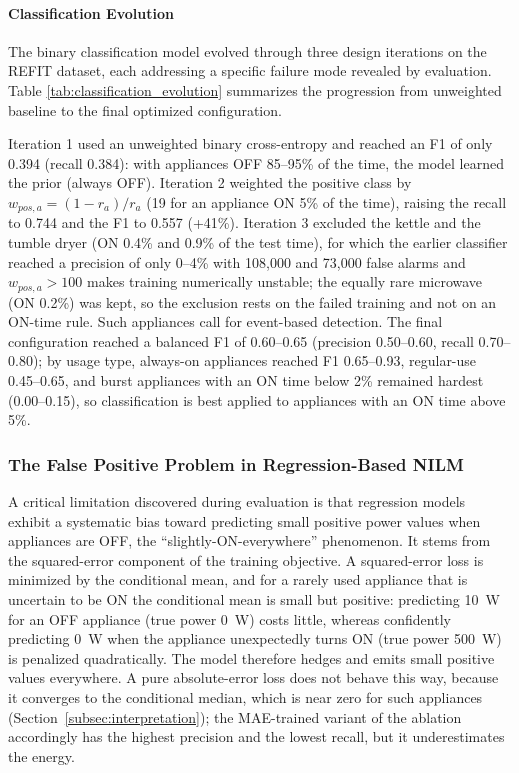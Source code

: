 \documentclass[fleqn,10pt]{wlscirep}
\begin{document}
\paragraph{Classification Evolution} The binary classification model evolved through three design iterations on the REFIT dataset, each addressing a specific failure mode revealed by evaluation. Table \ref{tab:classification_evolution} summarizes the progression from unweighted baseline to the final optimized configuration.


Iteration 1 used an unweighted binary cross-entropy and reached an F1 of only 0.394 (recall 0.384): with appliances OFF 85--95\% of the time, the model learned the prior (always OFF). Iteration 2 weighted the positive class by $w_{pos,a}=(1-r_a)/r_a$ (19 for an appliance ON 5\% of the time), raising the recall to 0.744 and the F1 to 0.557 (+41\%). Iteration 3 excluded the kettle and the tumble dryer (ON 0.4\% and 0.9\% of the test time), for which the earlier classifier reached a precision of only 0--4\% with 108{,}000 and 73{,}000 false alarms and $w_{pos,a}>100$ makes training numerically unstable; the equally rare microwave (ON 0.2\%) was kept, so the exclusion rests on the failed training and not on an ON-time rule. Such appliances call for event-based detection. The final configuration reached a balanced F1 of 0.60--0.65 (precision 0.50--0.60, recall 0.70--0.80); by usage type, always-on appliances reached F1 0.65--0.93, regular-use 0.45--0.65, and burst appliances with an ON time below 2\% remained hardest (0.00--0.15), so classification is best applied to appliances with an ON time above 5\%.

\subsubsection{The False Positive Problem in Regression-Based NILM}
\label{subsubsec:false_positive_problem}

A critical limitation discovered during evaluation is that regression models exhibit a systematic bias toward predicting small positive power values when appliances are OFF, the ``slightly-ON-everywhere'' phenomenon. It stems from the squared-error component of the training objective. A squared-error loss is minimized by the conditional mean, and for a rarely used appliance that is uncertain to be ON the conditional mean is small but positive: predicting 10~W for an OFF appliance (true power 0~W) costs little, whereas confidently predicting 0~W when the appliance unexpectedly turns ON (true power 500~W) is penalized quadratically. The model therefore hedges and emits small positive values everywhere. A pure absolute-error loss does not behave this way, because it converges to the conditional median, which is near zero for such appliances (Section~\ref{subsec:interpretation}); the MAE-trained variant of the ablation accordingly has the highest precision and the lowest recall, but it underestimates the energy.
\end{document}

